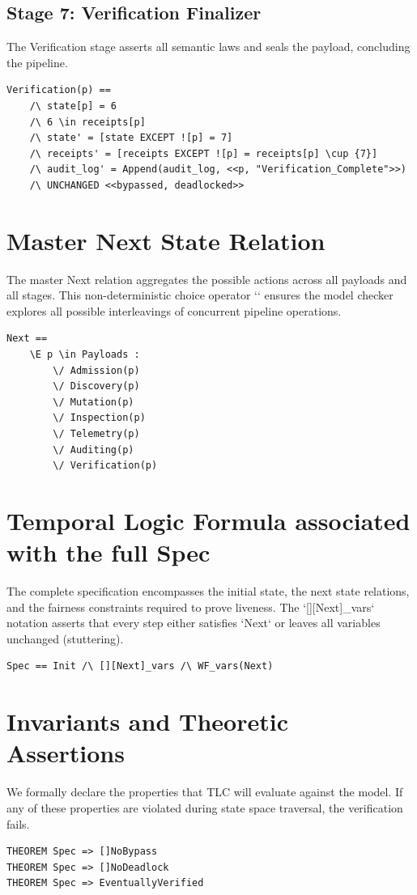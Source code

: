 \subsection{Stage 7: Verification Finalizer}
The Verification stage asserts all semantic laws and seals the payload, concluding the pipeline.
\begin{verbatim}
Verification(p) ==
    /\ state[p] = 6
    /\ 6 \in receipts[p]
    /\ state' = [state EXCEPT ![p] = 7]
    /\ receipts' = [receipts EXCEPT ![p] = receipts[p] \cup {7}]
    /\ audit_log' = Append(audit_log, <<p, "Verification_Complete">>)
    /\ UNCHANGED <<bypassed, deadlocked>>
\end{verbatim}

\section{Master Next State Relation}
The master Next relation aggregates the possible actions across all payloads and all stages. This non-deterministic choice operator `\E` ensures the model checker explores all possible interleavings of concurrent pipeline operations.

\begin{verbatim}
Next == 
    \E p \in Payloads :
        \/ Admission(p)
        \/ Discovery(p)
        \/ Mutation(p)
        \/ Inspection(p)
        \/ Telemetry(p)
        \/ Auditing(p)
        \/ Verification(p)
\end{verbatim}

\section{Temporal Logic Formula associated with the full Spec}
The complete specification encompasses the initial state, the next state relations, and the fairness constraints required to prove liveness. The `[][Next]_vars` notation asserts that every step either satisfies `Next` or leaves all variables unchanged (stuttering).

\begin{verbatim}
Spec == Init /\ [][Next]_vars /\ WF_vars(Next)
\end{verbatim}

\section{Invariants and Theoretic Assertions}
We formally declare the properties that TLC will evaluate against the model. If any of these properties are violated during state space traversal, the verification fails.
\begin{verbatim}
THEOREM Spec => []NoBypass
THEOREM Spec => []NoDeadlock
THEOREM Spec => EventuallyVerified
\end{verbatim}

